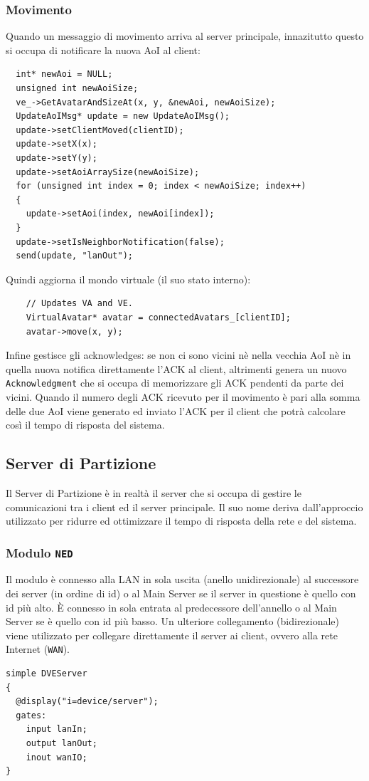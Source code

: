 \documentclass[a4paper, 11pt, oneside]{book}
\theoremstyle{definition}
\theoremstyle{remark}
\begin{document}
\subsubsection{Movimento}
Quando un messaggio di movimento arriva al server principale, innazitutto
questo si occupa di notificare la nuova AoI al client:
\begin{lstlisting}
  int* newAoi = NULL;
  unsigned int newAoiSize;
  ve_->GetAvatarAndSizeAt(x, y, &newAoi, newAoiSize);
  UpdateAoIMsg* update = new UpdateAoIMsg();
  update->setClientMoved(clientID);
  update->setX(x);
  update->setY(y);
  update->setAoiArraySize(newAoiSize);
  for (unsigned int index = 0; index < newAoiSize; index++)
  {
    update->setAoi(index, newAoi[index]);
  }
  update->setIsNeighborNotification(false);
  send(update, "lanOut");
\end{lstlisting}
Quindi aggiorna il mondo virtuale (il suo stato interno):
\begin{lstlisting}
    // Updates VA and VE.
    VirtualAvatar* avatar = connectedAvatars_[clientID];
    avatar->move(x, y);
\end{lstlisting}
Infine gestisce gli acknowledges: se non ci sono vicini nè nella vecchia AoI
nè in quella nuova notifica direttamente l'ACK al client, altrimenti genera un
nuovo \texttt{Acknowledgment} che si occupa di memorizzare gli ACK pendenti da
parte dei vicini.
Quando il numero degli ACK ricevuto per il movimento è pari alla somma
delle due AoI viene generato ed inviato l'ACK per il client che potrà calcolare
così il tempo di risposta del sistema.

\subsection{Server di Partizione}
Il Server di Partizione è in realtà il server che si occupa di gestire le
comunicazioni tra i client ed il server principale. Il suo nome deriva
dall'approccio utilizzato per ridurre ed ottimizzare il tempo di risposta della
rete e del sistema.

\subsubsection{Modulo \texttt{NED}}
Il modulo è connesso alla LAN in sola uscita (anello unidirezionale) al
successore dei server (in ordine di id) o al Main Server se il server in
questione è quello con id più alto. \`E connesso in sola entrata al
predecessore dell'annello o al Main Server se è quello con id più basso. Un ulteriore
collegamento (bidirezionale) viene utilizzato per collegare direttamente
il server ai client, ovvero alla rete Internet (\texttt{WAN}).
\begin{lstlisting}
simple DVEServer
{
  @display("i=device/server");
  gates:
    input lanIn;
    output lanOut;
    inout wanIO;
}
\end{lstlisting}
\end{document}
